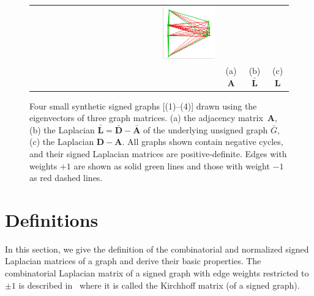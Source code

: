 \documentclass[11pt,a4paper]{book}
\newcommand{\wToy}{0.288}
\begin{document}
\begin{figure}[h!]
\begin{tabular}{rccc}
    \includegraphics[width=\wToy\textwidth]{img-sgd/toy.3.l} \\
    
    & (a) $\mathbf A$ & (b) $\mathbf{\bar L}$ & (c) $\mathbf L$
  \end{tabular}

  \caption{
    Four small synthetic signed graphs [(1)--(4)] drawn using the
    eigenvectors of three graph matrices. 
    (a) the adjacency matrix~$\mathbf A$,  (b) the Laplacian
     $\mathbf{\bar L} = \mathbf{\bar D}-\mathbf{\bar A}$ of the underlying unsigned
    graph $\bar G$,  (c) the Laplacian $\mathbf 
    D-\mathbf A$. 
    All graphs shown contain
    negative cycles, and their signed Laplacian matrices are 
    positive-definite. 
    Edges with weights $+1$ are shown as solid green lines and
    those with weight $-1$ as red dashed lines. 
  }
  \label{fig:toy}
\end{figure}

\section{Definitions}
\label{sec:signed:def}
In this section, we give the definition of the combinatorial and
normalized signed Laplacian matrices of 
a graph and derive their basic properties.
The combinatorial Laplacian matrix of a signed graph with edge weights
restricted to ${\pm 1}$ is described in~\cite{b351} where it is called
the Kirchhoff matrix (of a signed graph).  
\end{document}

